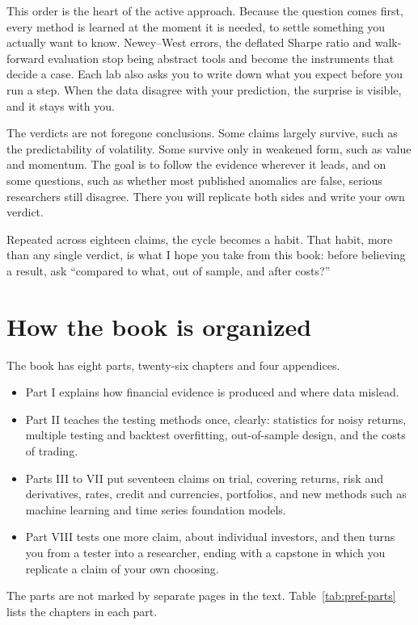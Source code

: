 This order is the heart of the active approach. Because the question comes first, every method is learned at the moment it is needed, to settle something you actually want to know. Newey--West errors, the deflated Sharpe ratio and walk-forward evaluation stop being abstract tools and become the instruments that decide a case. Each lab also asks you to write down what you expect before you run a step. When the data disagree with your prediction, the surprise is visible, and it stays with you.

The verdicts are not foregone conclusions. Some claims largely survive, such as the predictability of volatility. Some survive only in weakened form, such as value and momentum. The goal is to follow the evidence wherever it leads, and on some questions, such as whether most published anomalies are false, serious researchers still disagree. There you will replicate both sides and write your own verdict.

Repeated across eighteen claims, the cycle becomes a habit. That habit, more than any single verdict, is what I hope you take from this book: before believing a result, ask ``compared to what, out of sample, and after costs?''

\section*{How the book is organized}

The book has eight parts, twenty-six chapters and four appendices.

\begin{itemize}
  \item Part I explains how financial evidence is produced and where data mislead.
  \item Part II teaches the testing methods once, clearly: statistics for noisy returns, multiple testing and backtest overfitting, out-of-sample design, and the costs of trading.
  \item Parts III to VII put seventeen claims on trial, covering returns, risk and derivatives, rates, credit and currencies, portfolios, and new methods such as machine learning and time series foundation models.
  \item Part VIII tests one more claim, about individual investors, and then turns you from a tester into a researcher, ending with a capstone in which you replicate a claim of your own choosing.
\end{itemize}

The parts are not marked by separate pages in the text. Table~\ref{tab:pref-parts} lists the chapters in each part.

